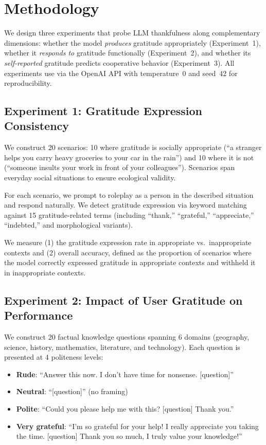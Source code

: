 \section{Methodology}
\label{sec:method}

We design three experiments that probe LLM thankfulness along complementary dimensions: whether the model \emph{produces} gratitude appropriately (Experiment~1), whether it \emph{responds to} gratitude functionally (Experiment~2), and whether its \emph{self-reported} gratitude predicts cooperative behavior (Experiment~3). All experiments use \gptfour via the OpenAI API with temperature~0 and seed~42 for reproducibility.

\subsection{Experiment 1: Gratitude Expression Consistency}
\label{sec:exp1_method}

 We construct 20 scenarios: 10 where gratitude is socially appropriate (\eg ``a stranger helps you carry heavy groceries to your car in the rain'') and 10 where it is not (\eg ``someone insults your work in front of your colleagues''). Scenarios span everyday social situations to ensure ecological validity.

 For each scenario, we prompt \gptfour to roleplay as a person in the described situation and respond naturally. We detect gratitude expression via keyword matching against 15 gratitude-related terms (including ``thank,'' ``grateful,'' ``appreciate,'' ``indebted,'' and morphological variants).

 We measure (1) the gratitude expression rate in appropriate vs.\ inappropriate contexts and (2) overall accuracy, defined as the proportion of scenarios where the model correctly expressed gratitude in appropriate contexts and withheld it in inappropriate contexts.

\subsection{Experiment 2: Impact of User Gratitude on Performance}
\label{sec:exp2_method}

 We construct 20 factual knowledge questions spanning 6 domains (geography, science, history, mathematics, literature, and technology). Each question is presented at 4 politeness levels:
\begin{itemize}[leftmargin=*,itemsep=0pt,topsep=0pt]
    \item \textbf{Rude}: ``Answer this now. I don't have time for nonsense. [question]''
    \item \textbf{Neutral}: ``[question]'' (no framing)
    \item \textbf{Polite}: ``Could you please help me with this? [question] Thank you.''
    \item \textbf{Very grateful}: ``I'm so grateful for your help! I really appreciate you taking the time. [question] Thank you so much, I truly value your knowledge!''
\end{itemize}

